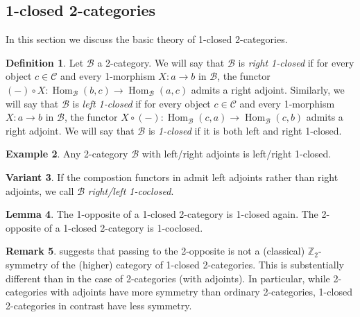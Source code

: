 \documentclass{article}
\newcommand{\Hom}{\operatorname{Hom}}%
\newcommand{\B}{\mathcal{B}}
\newcommand{\C}{\mathcal{C}}
\newcommand{\Z}{\mathbb{Z}}
\numberwithin{equation}{section}
\theoremstyle{definition}
\newtheorem{definition}{Definition}[subsection]
\newtheorem{example}[definition]{Example}
\newtheorem{lemma}[definition]{Lemma}
\newtheorem{remark}[definition]{Remark}
\newtheorem{variant}[definition]{Variant}
\theoremstyle{theorem}
\begin{document}
\subsection{1-closed 2-categories}\label{Subsection: 1-closed 2-categories}
In this section we discuss the basic theory of 1-closed 2-categories. 
\begin{definition}\label{Definition: closed 2-categories}
    Let $\B$ a 2-category. We will say that $\B$ is \emph{right 1-closed} if for every object $c \in \C$ and every 1-morphism $X \colon a \to b$ in $\B$, 
    the functor $(-) \circ X \colon \Hom_{\B}(b,c) \to \Hom_{\B}(a,c)$ admits a right adjoint. Similarly, we will say that $\B$ is \emph{left 1-closed} if 
    for every object $c \in \C$ and every 1-morphism $X \colon a \to b$ in $\B$, the functor $X \circ (-) \colon \Hom_{\B}(c,a) \to \Hom_{\B}(c,b)$ 
    admits a right adjoint. We will say that $\B$ is \emph{1-closed} if it is both left and right 1-closed.
\end{definition}
\begin{example}
    Any 2-category $\B$ with left/right adjoints is left/right 1-closed.
\end{example}
\begin{variant}
    If the compostion functors in  admit left adjoints rather than right adjoints, we call $\B$ \emph{right/left 1-coclosed}.
\end{variant}
\begin{lemma}\label{Lemma: opposites of closed 2-categories}
    The 1-opposite of a 1-closed 2-category is 1-closed again. The 2-opposite of a 1-closed 2-category is 1-coclosed. 
\end{lemma}
\begin{remark}
     suggests that passing to the 2-opposite is not a (classical) $\Z_2$-symmetry of the (higher) category of 1-closed 
    2-categories. This is substentially different than in the case of 2-categories (with adjoints). In particular, while 2-categories with adjoints have 
    more symmetry than ordinary 2-categories, 1-closed 2-categories in contrast have less symmetry. 
\end{remark}
\end{document}
